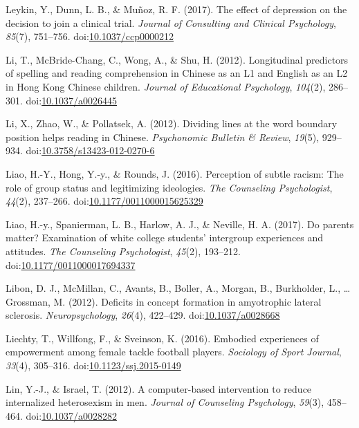\documentclass[english,man]{apa6}
\theoremstyle{definition}
\theoremstyle{definition}
\theoremstyle{definition}
\theoremstyle{remark}
\begin{document}
\hypertarget{ref-Leykin2017a}{}
Leykin, Y., Dunn, L. B., \& Muñoz, R. F. (2017). The effect of
depression on the decision to join a clinical trial. \emph{Journal of
Consulting and Clinical Psychology}, \emph{85}(7), 751--756.
doi:\href{https://doi.org/10.1037/ccp0000212}{10.1037/ccp0000212}

\hypertarget{ref-Li2012a}{}
Li, T., McBride-Chang, C., Wong, A., \& Shu, H. (2012). Longitudinal
predictors of spelling and reading comprehension in Chinese as an L1 and
English as an L2 in Hong Kong Chinese children. \emph{Journal of
Educational Psychology}, \emph{104}(2), 286--301.
doi:\href{https://doi.org/10.1037/a0026445}{10.1037/a0026445}

\hypertarget{ref-Li2012}{}
Li, X., Zhao, W., \& Pollatsek, A. (2012). Dividing lines at the word
boundary position helps reading in Chinese. \emph{Psychonomic Bulletin
\& Review}, \emph{19}(5), 929--934.
doi:\href{https://doi.org/10.3758/s13423-012-0270-6}{10.3758/s13423-012-0270-6}

\hypertarget{ref-Liao2016}{}
Liao, H.-Y., Hong, Y.-y., \& Rounds, J. (2016). Perception of subtle
racism: The role of group status and legitimizing ideologies. \emph{The
Counseling Psychologist}, \emph{44}(2), 237--266.
doi:\href{https://doi.org/10.1177/0011000015625329}{10.1177/0011000015625329}

\hypertarget{ref-Liao2017}{}
Liao, H.-y., Spanierman, L. B., Harlow, A. J., \& Neville, H. A. (2017).
Do parents matter? Examination of white college students' intergroup
experiences and attitudes. \emph{The Counseling Psychologist},
\emph{45}(2), 193--212.
doi:\href{https://doi.org/10.1177/0011000017694337}{10.1177/0011000017694337}

\hypertarget{ref-Libon2012}{}
Libon, D. J., McMillan, C., Avants, B., Boller, A., Morgan, B.,
Burkholder, L., \ldots{} Grossman, M. (2012). Deficits in concept
formation in amyotrophic lateral sclerosis. \emph{Neuropsychology},
\emph{26}(4), 422--429.
doi:\href{https://doi.org/10.1037/a0028668}{10.1037/a0028668}

\hypertarget{ref-Liechty2016}{}
Liechty, T., Willfong, F., \& Sveinson, K. (2016). Embodied experiences
of empowerment among female tackle football players. \emph{Sociology of
Sport Journal}, \emph{33}(4), 305--316.
doi:\href{https://doi.org/10.1123/ssj.2015-0149}{10.1123/ssj.2015-0149}

\hypertarget{ref-Lin2012}{}
Lin, Y.-J., \& Israel, T. (2012). A computer-based intervention to
reduce internalized heterosexism in men. \emph{Journal of Counseling
Psychology}, \emph{59}(3), 458--464.
doi:\href{https://doi.org/10.1037/a0028282}{10.1037/a0028282}
\end{document}
